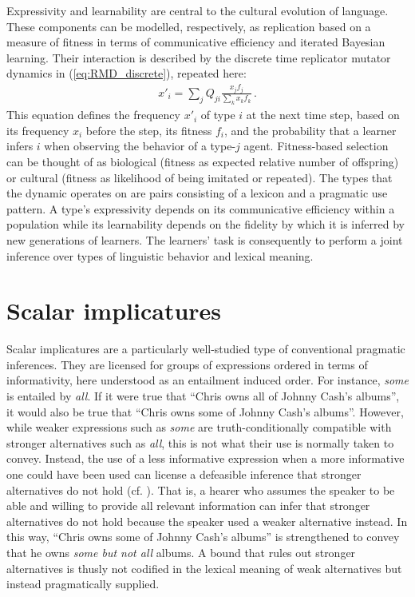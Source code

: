 \documentclass[a4paper, 11pt]{article}
\begin{document}
Expressivity and learnability are central to the cultural evolution of language. These
components can be modelled, respectively, as replication based on a measure of fitness in terms
of communicative efficiency and iterated Bayesian learning. Their interaction is described by
the discrete time replicator mutator dynamics in (\ref{eq:RMD_discrete}), repeated here:
\begin{align*}
  x'_i = \sum_j Q_{ji} \frac{x_jf_j}{\sum_k x_k f_k}\,.
\end{align*}
This equation defines the frequency $x'_i$ of type $i$ at the next time step, based on its
frequency $x_i$ before the step, its fitness $f_i$, and the probability that a learner infers
$i$ when observing the behavior of a type-$j$ agent. Fitness-based selection can be thought of
as biological (fitness as expected relative number of offspring) or cultural (fitness as 
likelihood of being imitated or repeated). The types that the dynamic operates on are pairs
consisting of a lexicon and a pragmatic use pattern. A type's expressivity depends on its
communicative efficiency within a population while its learnability depends on the fidelity by
which it is inferred by new generations of learners. The learners' task is consequently to
perform a joint inference over types of linguistic behavior and lexical meaning.


\section{Scalar implicatures}\label{sec:si-case-study}
%
Scalar implicatures are a particularly well-studied type of conventional pragmatic inferences. They are licensed for groups of expressions ordered in terms of informativity, here understood as an entailment induced order. For instance, {\em some} is entailed by {\em all}. If it were true that ``Chris owns all of Johnny Cash's albums'', it would also be true that ``Chris owns some of Johnny Cash's albums''. However, while weaker expressions such as {\em some} are truth-conditionally compatible with stronger alternatives such as {\em all}, this is not what their use is normally taken to convey. Instead, the use of a less informative expression when a more informative one could have been used can license a defeasible inference that stronger alternatives do not hold (cf. \citealt{horn:1972,gazdar:1979}). That is, a hearer who assumes the speaker to be able and willing to provide all relevant information can infer that stronger alternatives do not hold because the speaker used a weaker alternative instead. In this way, ``Chris owns some of Johnny Cash's albums'' is strengthened to convey that he owns {\em some but not all} albums. A bound that rules out stronger alternatives is thusly not codified in the lexical meaning of weak alternatives but instead pragmatically supplied.
\end{document}
